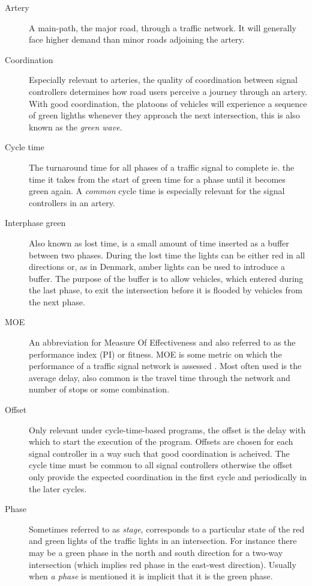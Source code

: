 \begin{description}

\item[Artery] A main-path, the major road, through a traffic network. It will generally face higher demand than minor roads adjoining the artery.
			
\item[Coordination] Especially relevant to arteries, the quality of coordination between signal controllers determines how road users perceive a journey through an artery. With good coordination, the platoons of vehicles will experience a sequence of green lighths whenever they approach the next intersection, this is also known as the \textit{green wave}.
			
\item[Cycle time] The turnaround time for all phases of a traffic signal to complete ie. the time it takes from the start of green time for a phase until it becomes green again. A \textit{common} cycle time is especially relevant for the signal controllers in an artery.

\item[Interphase green] Also known as lost time, is a small amount of time inserted as a buffer between two phases. During the lost time the lights can be either red in all directions or, as in Denmark, amber lights can be used to introduce a buffer. The purpose of the buffer is to allow vehicles, which entered during the last phase, to exit the intersection before it is flooded by vehicles from the next phase.

\item[MOE] An abbreviation for Measure Of Effectiveness and also referred to as the performance index (PI) or fitness. MOE is some metric on which the performance of a traffic signal network is assessed .
	Most often used is the average delay, also common is the travel time through the network and number of stops or some combination.
	
\item[Offset] Only relevant under cycle-time-based programs, the offset is the delay with which to start the execution of the program. Offsets are chosen for each signal controller in a way such that good coordination is acheived. The cycle time must be common to all signal controllers otherwise the offset only provide the expected coordination in the first cycle and periodically in the later cycles.
	
	\item[Phase] Sometimes referred to as \textit{stage}, corresponds to a particular state of the red and green lights of the traffic lights in an intersection.
	For instance there may be a green phase in the north and south direction for a two-way intersection (which implies red phase in the east-west direction). Usually when \textit{a phase} is mentioned it is implicit that it is the green phase.
	

\end{description}
